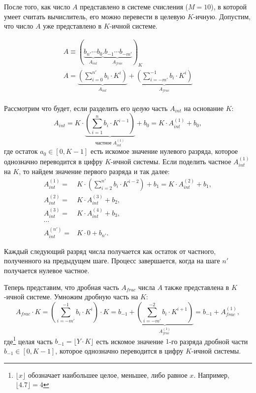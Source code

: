После того, как число $A$ представлено в системе счисления ($M=10$), в которой умеет считать вычислитель, его можно перевести в целевую $K$-ичную. Допустим, что число $A$ уже представлено в $K$-ичной системе. 

\[
    \begin{matrix}
        A\equiv(\underbrace{b_{n'}\cdots b_0}_{A_{int}}\underbrace{.b_{-1}\cdots b_{-m'}}_{A_{frac}})_K\\
        A=
            \underbrace{\left(\sum_{i=0}^{n'}b_i\cdot K^i\right)}_{A_{int}} + 
            \underbrace{\left(\sum_{i=-m'}^{-1}b_i\cdot K^i\right)}_{A_{frac}}\\
    \end{matrix}
\]

Рассмотрим что будет, если разделить его \emph{целую} часть $A_{int}$ на основание $K$:
\[
    A_{int}=K\cdot\underbrace{\left(\sum_{i=1}^{n}b_i\cdot K^{i-1}\right)}_\text{частное $A_{int}^{(1)}$}+b_{0} = K\cdot A_{int}^{(1)} + b_{0},
\]
где остаток $a_{0}\in[0,K-1]$ есть искомое значение нулевого разряда, которое однозначно переводится в цифру $K$-ичной системы. Если поделить частное $A_{int}^{(1)}$ на $K$, то найдем значение первого разряда и так далее: 
\begin{align*}
    \displaystyle
    A_{int}^{(1)}=&K\cdot\left(\sum_{i=2}^{n'}b_i\cdot K^{i-2}\right)+b_{1} = K\cdot A_{int}^{(2)}+b_{1},\\
    A_{int}^{(2)}=&K\cdot A_{int}^{(3)}+b_{2},\\
    A_{int}^{(3)}=&K\cdot A_{int}^{(4)}+b_{3},\\
    \cdots \\
    A_{int}^{(n')}=&K\cdot 0 + b_{n'}.
\end{align*}

Каждый следующий разряд числа получается как остаток от частного, полученного на предыдущем шаге. Процесс завершается, когда на шаге $n'$ получается нулевое частное.

Теперь представим, что дробная часть $A_{frac}$ числа $A$ также представлена в $K$-ичной системе. Умножим дробную часть на $K$:
\[
    A_{frac}\cdot K = 
        \left(\sum_{i=-m'}^{-1}b_i\cdot K^{i} \right)\cdot K=
            b_{-1} + 
            \underbrace{\left(\sum_{i=-m'}^{-2}b_i\cdot K^{i+1}\right)}_{A_{frac}^{(1)}}
            = b_{-1} + A_{frac}^{(1)},
\]
где\footnote{$\lfloor x\rfloor$ обозначает наибольшее целое, меньшее, либо равное $x$. Например, $\lfloor 4.7\rfloor = 4$} целая часть $b_{-1}=\lfloor Y\cdot K\rfloor$ есть искомое значение $1$-го разряда дробной части $b_{-1}\in[0,K-1]$, которое однозначно переводится в цифру $K$-ичной системы.

